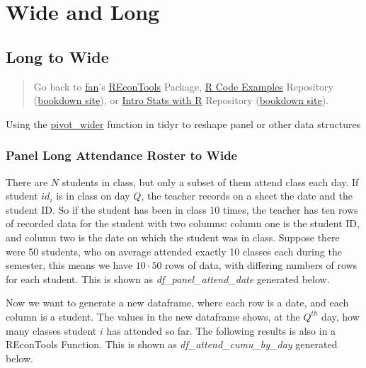 \documentclass[
]{book}
\begin{document}
\hypertarget{wide-and-long}{%
\section{Wide and Long}\label{wide-and-long}}

\hypertarget{long-to-wide}{%
\subsection{Long to Wide}\label{long-to-wide}}

\begin{quote}
Go back to \href{http://fanwangecon.github.io/}{fan}'s \href{https://fanwangecon.github.io/REconTools/}{REconTools} Package, \href{https://fanwangecon.github.io/R4Econ/}{R Code Examples} Repository (\href{https://fanwangecon.github.io/R4Econ/bookdown}{bookdown site}), or \href{https://fanwangecon.github.io/Stat4Econ/}{Intro Stats with R} Repository (\href{https://fanwangecon.github.io/Stat4Econ/bookdown}{bookdown site}).
\end{quote}

Using the \href{https://tidyr.tidyverse.org/reference/pivot_wider.html}{pivot\_wider} function in tidyr to reshape panel or other data structures

\hypertarget{panel-long-attendance-roster-to-wide}{%
\subsubsection{Panel Long Attendance Roster to Wide}\label{panel-long-attendance-roster-to-wide}}

There are \(N\) students in class, but only a subset of them attend class each day. If student \(id_i\) is in class on day \(Q\), the teacher records on a sheet the date and the student ID. So if the student has been in class 10 times, the teacher has ten rows of recorded data for the student with two columns: column one is the student ID, and column two is the date on which the student was in class. Suppose there were 50 students, who on average attended exactly 10 classes each during the semester, this means we have \(10 \cdot 50\) rows of data, with differing numbers of rows for each student. This is shown as \emph{df\_panel\_attend\_date} generated below.

Now we want to generate a new dataframe, where each row is a date, and each column is a student. The values in the new dataframe shows, at the \(Q^{th}\) day, how many classes student \(i\) has attended so far. The following results is also in a REconTools Function. This is shown as \emph{df\_attend\_cumu\_by\_day} generated below.
\end{document}
